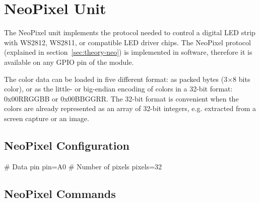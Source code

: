 \section{NeoPixel Unit}

The NeoPixel unit implements the protocol needed to control a digital \gls{LED} strip with WS2812, WS2811, or compatible \gls{LED} driver chips. The NeoPixel protocol (explained in section~\ref{sec:theory-neo}) is implemented in software, therefore it is available on any \gls{GPIO} pin of the module.

The color data can be loaded in five different format: as packed bytes (3$\times$8 bits color), or as the little- or big-endian encoding of colors in a 32-bit format: 0x00RRGGBB or 0x00BBGGRR. The 32-bit format is convenient when the colors are already represented as an array of 32-bit integers, e.g. extracted from a screen capture or an image.

\subsection{NeoPixel Configuration}

\begin{inicode}
# Data pin
pin=A0
# Number of pixels
pixels=32
\end{inicode}

\subsection{NeoPixel Commands}


